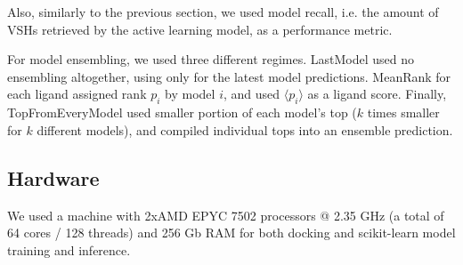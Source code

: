 Also, similarly to the previous section, we used model recall, i.e. the amount of VSHs retrieved by the active learning model, as a performance metric.

For model ensembling, we used three different regimes. LastModel used no ensembling altogether, using only for the latest model predictions. MeanRank for each ligand assigned rank $p_i$ by model $i$, and used $\langle p_i \rangle$ as a ligand score. Finally, TopFromEveryModel used smaller portion of each model's top ($k$ times smaller for $k$ different models), and compiled individual tops into an ensemble prediction.


\subsection{Hardware}
We used a machine with 2xAMD EPYC 7502 processors @ 2.35 GHz (a total of 64 cores / 128 threads) and 256 Gb RAM for both docking and scikit-learn model training and inference.
